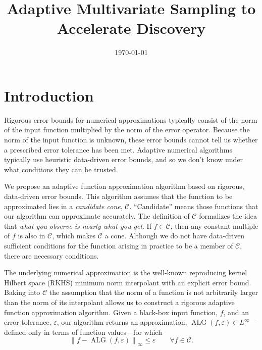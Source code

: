 \documentclass[]{mcom-l}
\title{Adaptive Multivariate Sampling to Accelerate Discovery}
\author{}
\date{\today}
\theoremstyle{remark}
\DeclareMathOperator{\ALG}{ALG}
\newcommand{\cc}{\mathcal{C}}
\newcommand{\calc}{{\mathcal{C}}}
\newcommand{\norm}[2][{}]{\ensuremath{\left \lVert #2 \right \rVert}_{#1}}
\begin{document}
\maketitle

\section{Introduction}
Rigorous error bounds for numerical approximations typically consist of the norm of the input function multiplied by the norm of the error operator.  Because the norm of the input function is unknown, these error bounds cannot tell us whether a prescribed error tolerance has been met.  Adaptive numerical algorithms typically use heuristic data-driven error bounds, and so we don't know under what conditions they can be trusted.

We propose an adaptive function approximation algorithm based on rigorous, data-driven error bounds.  This algorithm assumes that the function to be approximated lies in a \emph{candidate cone}, $\cc$.  ``Candidate'' means those functions that our algorithm can approximate accurately.  The definition of $\cc$ formalizes the idea that \emph{what you observe is nearly what you get}.  If $f \in \cc$, then any constant multiple of $f$ is also in $\cc$, which makes $\cc$ a cone.  Although we do not have data-driven sufficient conditions for the function arising in practice to be a member of $\calc$, there are necessary conditions.

The underlying numerical approximation is the well-known reproducing kernel Hilbert space (RKHS) minimum norm interpolant with an explicit error bound.  Baking into $\cc$ the assumption that the norm of a function is not arbitrarily larger than the norm of its interpolant allows us to construct a rigorous adaptive function approximation algorithm. Given a black-box input function, $f$, and an error tolerance, $\varepsilon$, our algorithm returns an approximation, $\ALG(f,\varepsilon) \in L^\infty$---defined only in terms of function values---for which 
\begin{equation} \label{eq:errorcrit}
\norm[\infty]{f - \ALG(f,\varepsilon)} \le \varepsilon \qquad \forall f\in \cc.
\end{equation}
\end{document}
